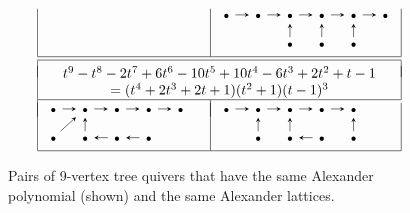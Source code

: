 \documentclass[11pt, letterpaper]{amsart}
\theoremstyle{definition}
\numberwithin{equation}{section}
\def\ZZ{{\mathbb Z}}
\def\GL{{\operatorname{GL}}}
\begin{document}
\begin{figure}[ht]
\begin{equation*}
\begin{array}{|l|l|}
\quad & 
\begin{tikzcd}[arrows={-stealth}, sep=1em]
  \scriptstyle\bullet  \arrow[r]   & \scriptstyle\bullet  \arrow[r] & \scriptstyle\bullet \arrow[r] & \scriptstyle\bullet \arrow[r] & \scriptstyle\bullet \arrow[r] & \scriptstyle\bullet \\
 & & \scriptstyle\bullet  \arrow[u]  & \scriptstyle\bullet \arrow[u] & \scriptstyle\bullet \arrow[u] & 
\end{tikzcd}
\\[15pt] 
\hline
\multicolumn{2}{c}{}\\[-10pt]
\hline
\multicolumn{2}{|c|}{}\\[-8pt]
\multicolumn{2}{|c|}{t^9 - t^8 - 2t^7 + 6t^6 - 10t^5 + 10t^4 - 6t^3 + 2t^2 + t - 1}\\
\multicolumn{2}{|c|}{=(t^4 + 2t^3 + 2t + 1)(t^2 + 1)(t - 1)^3} \\
\hline
\ \\[-10pt]
\begin{tikzcd}[arrows={-stealth}, sep=1em]
  \scriptstyle\bullet  \arrow[r]   & \scriptstyle\bullet  \arrow[r] & \scriptstyle\bullet \arrow[r] & \scriptstyle\bullet \arrow[r] & \scriptstyle\bullet \\
 \scriptstyle\bullet  \arrow[ur] & \scriptstyle\bullet  \arrow[u] &  \scriptstyle\bullet \arrow[l] & \scriptstyle\bullet \arrow[l] &
\end{tikzcd}
\quad & 
\begin{tikzcd}[arrows={-stealth}, sep=1em]
  \scriptstyle\bullet  \arrow[r]   & \scriptstyle\bullet  \arrow[r] & \scriptstyle\bullet \arrow[r] & \scriptstyle\bullet \arrow[r]  & \scriptstyle\bullet \\
 & \scriptstyle\bullet  \arrow[u] &  \scriptstyle\bullet \arrow[u] & \scriptstyle\bullet \arrow[l] & \scriptstyle\bullet \arrow[u]&
\end{tikzcd}
\\[15pt] 
\hline
\end{array}
\end{equation*}
\caption{Pairs of 9-vertex tree quivers that have the same Alexander polynomial (shown) and the same Alexander lattices.
}
\vspace{-5pt}
\label{fig:9-vertex-trees-3}
\end{figure}
\end{document}
